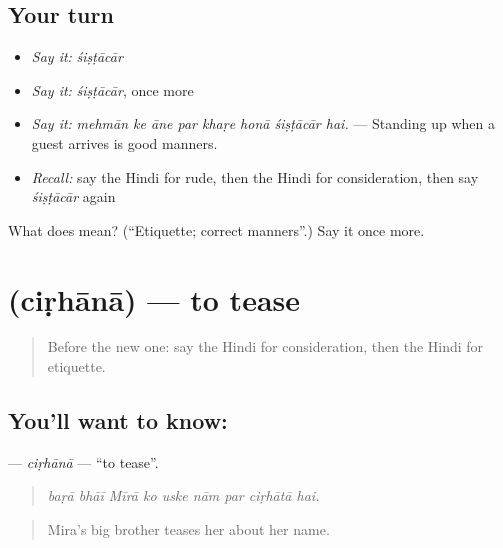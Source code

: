 \subsection*{Your turn}
\begin{itemize}
\raggedright
  \item \emph{Say it:} \emph{śiṣṭācār}
  \item \emph{Say it:} \emph{śiṣṭācār}, once more
  \item \emph{Say it:} \emph{mehmān ke āne par khaṛe honā śiṣṭācār hai.} — Standing up when a guest arrives is good manners.
  \item \emph{Recall:} say the Hindi for rude, then the Hindi for consideration, then say \emph{śiṣṭācār} again
\end{itemize}

\begin{tcolorbox}[breakable,colback=teal!4,colframe=teal!35!black,title={Before you move on}]
What does  mean? (\textquotedblleft{}Etiquette; correct manners\textquotedblright{}.) Say it once more.
\end{tcolorbox}
\section[\texorpdfstring{\hi{चिढ़ाना} (ciṛhānā)}{चिढ़ाना (ciṛhānā)}]{ (ciṛhānā) — to tease}

\label{lesson:HI-C471-cirhana}



\begin{quote}
Before the new one: say the Hindi for consideration, then the Hindi for etiquette.
\end{quote}

\subsection*{You'll want to know: }
\textbf{} — \emph{ciṛhānā} — \textquotedblleft{}to tease\textquotedblright{}.

\begin{quote}
        
\end{quote}

\begin{quote}
\emph{baṛā bhāī Mīrā ko uske nām par ciṛhātā hai.}
\end{quote}

\begin{quote}
Mira's big brother teases her about her name.
\end{quote}

